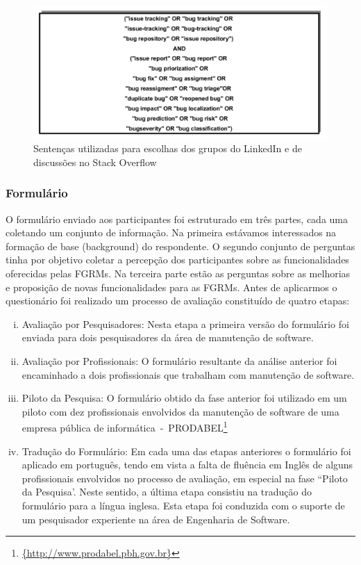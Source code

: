 \begin{figure}[htpb]
	\centering
	\includegraphics[width=0.5\linewidth]{./chapter-pesquisa-com-profissionais/img/setencas-grupos.pdf}
	\caption{Sentenças utilizadas para escolhas dos grupos do LinkedIn e de
		discussões no Stack Overflow}
\label{fig:setencas-grupos}
\end{figure}

\subsubsection{Formulário}
\label{subsubsec:questionario}

O formulário enviado aos participantes foi estruturado em três partes, cada uma
coletando um conjunto de informação. Na primeira estávamos interessados na
formação de base (background) do respondente. O segundo conjunto de perguntas
tinha por objetivo coletar a percepção dos participantes sobre as
funcionalidades oferecidas pelas FGRMs\@. Na terceira parte estão as perguntas
sobre as melhorias e proposição de novas funcionalidades para as FGRMs. Antes de
aplicarmos o questionário foi realizado um processo de avaliação constituído de
quatro etapas:

\begin{enumerate}[(i)]
	\item Avaliação por Pesquisadores: Nesta etapa a primeira versão do
		formulário foi enviada para dois pesquisadores da área de manutenção de
		software.
	\item Avaliação por Profissionais: O formulário resultante da análise
		anterior foi encaminhado a dois profissionais que trabalham com
		manutenção de software.
	\item Piloto da Pesquisa: O formulário obtido da fase anterior foi utilizado
		em um piloto com dez profissionais envolvidos da manutenção de software
		de uma empresa pública de
		informática~-~PRODABEL\footnote{\url{{http://www.prodabel.pbh.gov.br}}}
	\item Tradução do Formulário: Em cada uma das etapas anteriores o
		formulário foi aplicado em português, tendo em vista a falta de fluência
		em Inglês de alguns profissionais envolvidos no processo de avaliação,
		em especial na fase ``Piloto da Pesquisa'. Neste sentido, a última etapa
		consistiu na tradução do formulário para a língua inglesa. Esta etapa
		foi conduzida com  o suporte de um pesquisador experiente na área de
		Engenharia de Software.
\end{enumerate}

